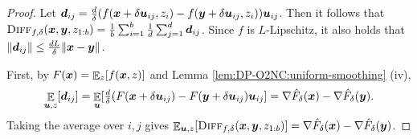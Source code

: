 
\begin{proof}
Let $\vecd_{ij} = \tfrac{d}{\delta}(f(\vecx+\delta\vecu_{ij},z_i)-f(\vecy+\delta\vecu_{ij},z_i))\vecu_{ij}$. Then it follows that \\
$\diff_{f,\delta}(\vecx,\vecy,z_{1:b}) = \frac{1}{b}\sum_{i=1}^b\frac{1}{d}\sum_{j=1}^d\vecd_{ij}$. Since $f$ is $L$-Lipschitz, it also holds that $\|\vecd_{ij}\| \le \frac{dL}{\delta}\|\vecx-\vecy\|$.

First, by $F(\vecx)=\E_z[f(\vecx,z)]$ and Lemma \ref{lem:DP-O2NC:uniform-smoothing} (iv),
\begin{align*}
    \E_{\vecu,z}[\vecd_{ij}]
    = \E_{\vecu}[\tfrac{d}{\delta}(F(\vecx+\delta\vecu_{ij})-F(\vecy+\delta\vecu_{ij})\vecu_{ij}]
    = \nabla\hat F_\delta(\vecx) - \nabla\hat F_\delta(\vecy).
\end{align*}
Taking the average over $i,j$ gives $\E_{\vecu,z}[ \diff_{f,\delta}(\vecx,\vecy,z_{1:b})] = \nabla\hat F_\delta(\vecx) - \nabla\hat F_\delta(\vecy)$.


\end{proof}
